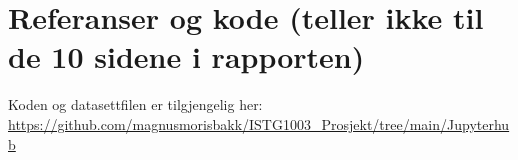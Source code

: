 \section{Referanser og kode (teller ikke til de 10 sidene i rapporten)}\label{referanser-og-kode}

Koden og datasettfilen er tilgjengelig her: \\
\url{https://github.com/magnusmorisbakk/ISTG1003\_Prosjekt/tree/main/Jupyterhub
} 

